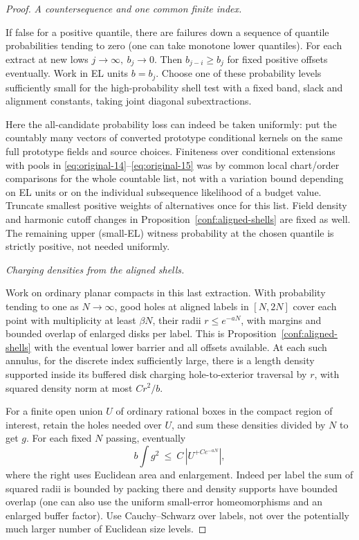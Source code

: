 \begin{proof}
\smallskip\noindent\emph{A countersequence and one common finite index.}\par

If false for a positive quantile, there are failures down a sequence of quantile probabilities
tending to zero (one can take monotone lower quantiles). For each extract at new lows \(j\to\infty,\
b_j\to0\). Then \(b_{j-i}\ge b_j\) for fixed positive offsets eventually. Work in EL units
\(b=b_j\). Choose one of these probability levels sufficiently small for the high-probability shell
test with a fixed band, slack and alignment constants, taking joint diagonal subextractions.

Here the all-candidate probability loss can indeed be taken uniformly: put the countably many
vectors of converted prototype conditional kernels on the same full prototype fields and source
choices. Finiteness over conditional extensions with pools in
\eqref{eq:original-14}--\eqref{eq:original-15} was by common local chart/order comparisons for the
whole countable list, not with a variation bound depending on EL units or on the individual
subsequence likelihood of a budget value. Truncate smallest positive weights of alternatives once
for this list. Field density and harmonic cutoff changes in Proposition~\ref{conf:aligned-shells}
are fixed as well. The remaining upper (small-EL) witness probability at the chosen quantile is
strictly positive, not needed uniformly.

\smallskip\noindent\emph{Charging densities from the aligned shells.}\par

Work on ordinary planar compacts in this last extraction. With probability tending to one as
\(N\to\infty\), good holes at aligned labels in \([N,2N]\) cover each point with multiplicity at
least \(\beta N\), their radii \(r\le e^{-aN}\), with margins and bounded overlap of enlarged disks
per label. This is Proposition~\ref{conf:aligned-shells} with the eventual lower barrier and all
offsets available. At each such annulus, for the discrete index sufficiently large, there is a
length density supported inside its buffered disk charging hole-to-exterior traversal by \(r\), with
squared density norm at most \(C r^2/b\).

For a finite open union \(U\) of ordinary rational boxes in the compact region of interest, retain
the holes needed over \(U\), and sum these densities divided by \(N\) to get \(g\). For each fixed
\(N\) passing, eventually
\[
 b\int g^2\ \le\ C\,|U^{+C e^{-aN}}|,
\]
where the right uses Euclidean area and enlargement. Indeed per label the sum of squared radii is
bounded by packing there and density supports have bounded overlap (one can also use the uniform
small-error homeomorphisms and an enlarged buffer factor). Use Cauchy–Schwarz over labels, not over
the potentially much larger number of Euclidean size levels.


\end{proof}
